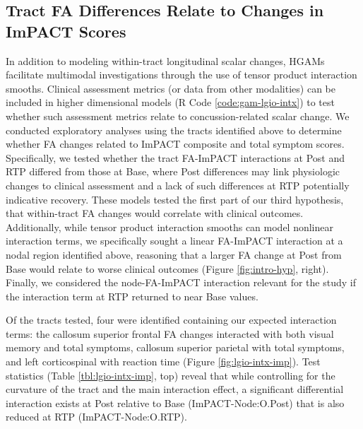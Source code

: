\documentclass[12pt]{article}
\begin{document}
\subsection{Tract FA Differences Relate to Changes in ImPACT Scores}
\label{ssec:res-dwi-imp}
In addition to modeling within-tract longitudinal scalar changes, HGAMs facilitate multimodal investigations through the use of tensor product interaction smooths. Clinical assessment metrics (or data from other modalities) can be included in higher dimensional models (R Code \ref{code:gam-lgio-intx}) to test whether such assessment metrics relate to concussion-related scalar change. We conducted exploratory analyses using the tracts identified above to determine whether FA changes related to ImPACT composite and total symptom scores. Specifically, we tested whether the tract FA-ImPACT interactions at Post and RTP differed from those at Base, where Post differences may link physiologic changes to clinical assessment and a lack of such differences at RTP potentially indicative recovery. These models tested the first part of our third hypothesis, that within-tract FA changes would correlate with clinical outcomes. Additionally, while tensor product interaction smooths can model nonlinear interaction terms, we specifically sought a linear FA-ImPACT interaction at a nodal region identified above, reasoning that a larger FA change at Post from Base would relate to worse clinical outcomes (Figure \ref{fig:intro-hyp}, right). Finally, we considered the node-FA-ImPACT interaction relevant for the study if the interaction term at RTP returned to near Base values.

Of the tracts tested, four were identified containing our expected interaction terms: the callosum superior frontal FA changes interacted with both visual memory and total symptoms, callosum superior parietal with total symptoms, and left corticospinal with reaction time (Figure \ref{fig:lgio-intx-imp}). Test statistics (Table \ref{tbl:lgio-intx-imp}, top) reveal that while controlling for the curvature of the tract and the main interaction effect, a significant differential interaction exists at Post relative to Base (ImPACT-Node:O.Post) that is also reduced at RTP (ImPACT-Node:O.RTP).
\end{document}
